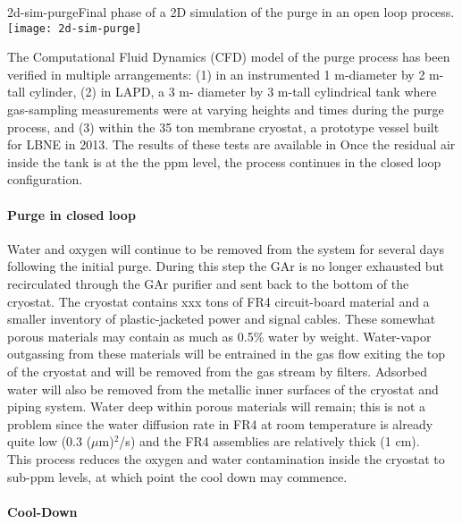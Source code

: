 \begin{cdrfigure}{2d-sim-purge}{Final phase of a 2D simulation of the purge in an open loop process.} 
\texttt{[image: 2d-sim-purge]}
\end{cdrfigure}

The Computational Fluid Dynamics (CFD) model of the purge process has been verified in multiple arrangements: (1) in an instrumented 1 m-diameter by 2 m-tall cylinder, (2) in LAPD, a 3 m- diameter by 3 m-tall cylindrical tank where gas-sampling measurements were at varying heights and times during the purge process, and (3) within the 35 ton membrane cryostat, a prototype vessel built for LBNE in 2013. The results of these tests are available in \cite{CFD_verification} 
%
Once the residual air inside the tank is at the the ppm level, the process continues in the closed loop configuration. 

\paragraph{Purge in closed loop}

Water and oxygen will continue to be removed from the system for several days following the initial purge. During this step the GAr is no longer exhausted but recirculated through the GAr purifier and sent back to the bottom of the cryostat. The cryostat contains xxx  tons of FR4 circuit-board material and a smaller inventory of plastic-jacketed power and signal cables. These somewhat porous materials may contain as much as 0.5\% water by weight. Water-vapor outgassing from these materials will be entrained in the gas flow exiting the top of the cryostat and will be removed from the gas stream by filters. Adsorbed water will also be removed from the metallic inner surfaces of the cryostat and piping system. Water deep within porous materials will remain; this is not a problem since the water diffusion rate in FR4 at room temperature is already quite low (0.3 ($\mu$m)$^2$/s) and the FR4 assemblies are relatively thick (1 cm).\\
%
This process reduces the oxygen and water contamination inside the cryostat to sub-ppm levels, at which point the cool down may commence.

\paragraph{Cool-Down}

